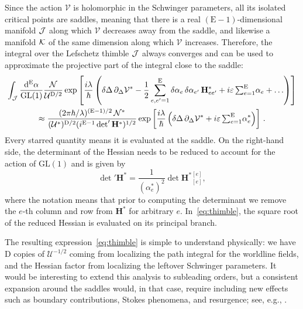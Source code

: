 \documentclass[12pt]{article}
\numberwithin{figure}{section}
\def \be {\begin{equation}}
\def \ee {\end{equation}}
\def \D {\mathrm{D}}
\def \E {\mathrm{E}}
\def \U {\mathcal{U}}
\def \d {\mathrm{d}}
\def \eps {\varepsilon}
\def \V {\mathcal{V}}
\def \GL {\mathrm{GL}}
\def \N {\mathcal{N}}
\begin{document}
	Since the action $\V$ is holomorphic in the Schwinger parameters, all its isolated critical points are saddles, meaning that there is a real $(\E{-}1)$-dimensional manifold $\cal J$ along which $\V$ decreases away from the saddle, and likewise a manifold $\cal K$ of the same dimension along which $\V$ increases. Therefore, the integral over the Lefschetz thimble $\cal J$ always converges and can be used to approximate the projective part of the integral close to the saddle:
	\begin{multline}
	\label{eq:thimble}
	    \int_{\cal J} \frac{\d^{\E} \alpha}{\GL(1)} \frac{\N}{\U^{\D/2}} \exp \left[ \frac{i\lambda}{\hbar} \left(\delta \Delta\, \partial_\Delta \V^\ast -\frac{1}{2} \sum_{e,e'=1}^{\E} \delta\alpha_e\, \delta\alpha_{e'}\, \mathbf{H}_{e e'}^\ast + i\eps\, {\textstyle\sum_{e=1}^{\E}}\alpha_e + \ldots \right) \right] \\ \approx 
	    \frac{(2\pi \hbar/\lambda)^{(\E-1)/2}\, \N^\ast}{(\U^\ast)^{\D/2} (i^{\E-1}\det' \mathbf{H}^\ast)^{1/2}} \exp \left[ \frac{i\lambda}{\hbar} \left(\delta \Delta\, \partial_\Delta \V^\ast + i\eps\, {\textstyle\sum_{e=1}^{\E}}\alpha_e^\ast\right) \right]\,.
	\end{multline}
	Every starred quantity means it is evaluated at the saddle.
	On the right-hand side, the determinant of the Hessian needs to be reduced to account for the action of $\GL(1)$ and is given by
	\be
	{\det}' \mathbf{H}^\ast = \frac{1}{(\alpha_e^\ast)^2} \det \mathbf{H}^\ast {}^{[e]}_{[e]},
	\label{eq:reducedH}
	\ee
	where the notation means that prior to computing the determinant we remove the $e$-th column and row from $\mathbf{H}^\ast$ for arbitrary $e$. In~\eqref{eq:thimble}, the square root of the reduced Hessian is evaluated on its principal branch.
	
	The resulting expression~\eqref{eq:thimble} is simple to understand physically: we have $\D$ copies of $\U^{-1/2}$ coming from localizing the path integral for the worldline fields, and the Hessian factor from localizing the leftover Schwinger parameters. It would be interesting to extend this analysis to subleading orders, but
	a consistent expansion around the saddles would, in that case, require including new effects such as boundary contributions, Stokes phenomena, and resurgence; see, e.g., \cite{Boyd1999}.
	
\end{document}
